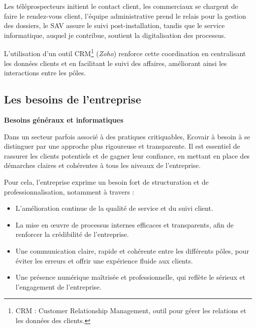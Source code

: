 Les téléprospecteurs initient le contact client, les commerciaux se chargent de faire le rendez-vous client, l’équipe administrative prend le relais pour la gestion des dossiers, le SAV assure le suivi post-installation, tandis que le service informatique, auquel je contribue, soutient la digitalisation des processus.

L’utilisation d’un outil CRM\footnote{CRM : Customer Relationship Management, outil pour gérer les relations et les données des clients.} (\textit{Zoho}) renforce cette coordination en centralisant les données clients et en facilitant le suivi des affaires, améliorant ainsi les interactions entre les pôles.

\subsection{Les besoins de l’entreprise}

\textbf{Besoins généraux et informatiques}\vspace{0.3cm}

Dans un secteur parfois associé à des pratiques critiquables, Ecovair à besoin à se distinguer par une approche plus rigoureuse et transparente. Il est essentiel de rassurer les clients potentiels et de gagner leur confiance, en mettant en place des démarches claires et cohérentes à tous les niveaux de l’entreprise.

Pour cela, l’entreprise exprime un besoin fort de structuration et de professionnalisation, notamment à travers :\vspace{0.3cm}

\begin{itemize}
    \item L’amélioration continue de la qualité de service et du suivi client.\vspace{0.3cm}
    \item La mise en œuvre de processus internes efficaces et transparents, afin de renforcer la crédibilité de l’entreprise.\vspace{0.3cm}
    \item Une communication claire, rapide et cohérente entre les différents pôles, pour éviter les erreurs et offrir une expérience fluide aux clients.\vspace{0.3cm}
    \item Une présence numérique maîtrisée et professionnelle, qui reflète le sérieux et l’engagement de l’entreprise.\vspace{0.3cm}
\end{itemize}

